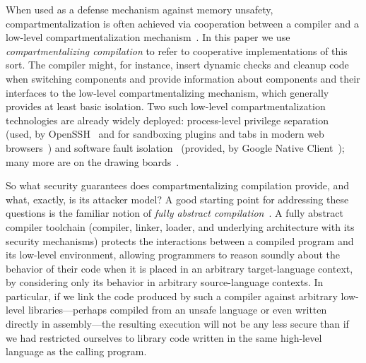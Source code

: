 \documentclass[10pt, conference, compsocconf, letterpaper, times]{IEEEtran}
\begin{document}
\iffull
{}\fi
When used as a defense mechanism against memory unsafety,
compartmentalization is often achieved via cooperation
between a compiler and a low-level compartmentalization
mechanism~\cite{KrollSA14, ZengTE13, JuglaretHAPST15, GudkaWACDLMNR15,
  PatrignaniDP16, cheri_oakland2015, cheri_asplos2015}.
In this paper we use {\em compartmentalizing compilation} to refer to
cooperative implementations of this sort.
The compiler might, for instance, insert dynamic checks and cleanup
code when switching components and provide information about
components and their interfaces to the low-level compartmentalizing
mechanism, which generally provides at least basic
isolation.
Two such low-level compartmentalization technologies are already widely
deployed: process-level privilege separation~\cite{Kilpatrick03,
  GudkaWACDLMNR15, wedge_nsdi2008} (used, \EG by OpenSSH~\cite{ProvosFH03}
and for sandboxing plugins and tabs in modern web browsers~\cite{ReisG09})
and software fault isolation~\cite{sfi_sosp1993} (provided, \EG by
Google Native Client~\cite{YeeSDCMOONF10}); many more
are on the drawing boards~\cite{micropolicies2015, sgx, PatrignaniDP16,
  cheri_oakland2015, cheri_asplos2015}.



So what security guarantees does compartmentalizing compilation provide,
and what, exactly, is its attacker model?
A good starting point for addressing these questions is the familiar notion
of {\em fully abstract compilation}~\cite{abadi_protection98,
  PatrignaniASJCP15, AgtenSJP12, abadi_aslr12, JagadeesanPRR11,
  FournetSCDSL13, AbadiPP13, AbadiP13, AhmedB11, AhmedB08, NewBA16}.
A fully abstract compiler toolchain (compiler, linker, loader, and
underlying architecture with its security mechanisms) protects the
interactions between a compiled program and its low-level environment,
allowing programmers to reason
soundly about the behavior of their code when it is placed in an arbitrary
target-language context, by considering only its behavior in arbitrary
source-language contexts.
In particular, if we link the code produced by such a compiler against
arbitrary low-level libraries---perhaps compiled from an unsafe language or
even written directly in assembly---the resulting execution will not be any less
secure than if we had restricted ourselves to library code written in the
same high-level language as the calling program.  
\end{document}
